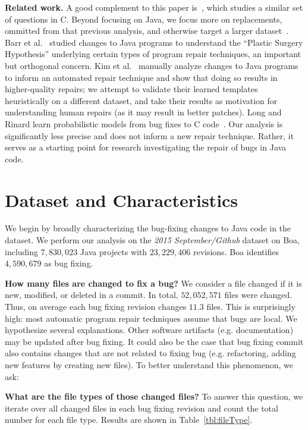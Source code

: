 \documentclass{sig-alternate-05-2015}
\begin{document}
\noindent\textbf{Related work.} A good complement to this paper is~\cite{zhong2015}, which studies 
a similar set of questions in C.  Beyond focusing on Java, we focus more on
replacements, ommitted from that previous analysis, and otherwise target a
larger dataset~\cite{dyer2013}.  Barr et al.~\cite{Barr14fse} studied changes to
Java programs to understand the ``Plastic Surgery Hypothesis'' underlying
certain types of program repair techniques, an important but orthogonal
concern. Kim et al.~\cite{kim2013} manually analyze 
changes to Java programs to inform an automated repair
technique and show that doing so results in higher-quality repairs; 
we attempt to validate their learned templates heuristically on
a different dataset, and take their results as
motivation for understanding human repairs (as it may result in better patches).
Long and Rinard learn probabilistic models from bug fixes to C
code~\cite{Long2016}. Our analysis is significantly less precise and does not
inform a new repair technique.  Rather, it serves as a starting
point for research investigating the repair of bugs in Java code.

\section{Dataset and Characteristics}

We begin by broadly characterizing the bug-fixing changes to Java code in the
dataset.  We perform our analysis on the \emph{2015 September/Github} dataset on
Boa, including $7,830,023$ Java projects with $23,229,406$ revisions. Boa
identifies $4,590,679$ as bug fixing.

\vspace{1ex}
\noindent\textbf{How many files are changed to fix a bug?}
%
We consider a file changed if it is new, modified, or
deleted in a commit. In total, $52,052,571$ files were changed. Thus, on average each bug
fixing revision changes $11.3$ files.  This is surprisingly high:
most automatic program repair techniques assume that bugs are local.
We hypothesize several explanations. Other
software artifacts (e.g.  documentation) may be updated after bug  
fixing. It could also be the case that bug fixing commit also contains changes
that are not related to fixing bug (e.g. refactoring, adding new features by
creating new files). To better understand this
phenomenon, we ask:

\vspace{1ex}
\noindent\textbf{What are the file types of those changed files?}
%
To answer this question, we iterate over all changed files in each bug fixing
revision and count the total number for each file type. Results are shown in
Table~\ref{tbl:fileType}.
\end{document}
